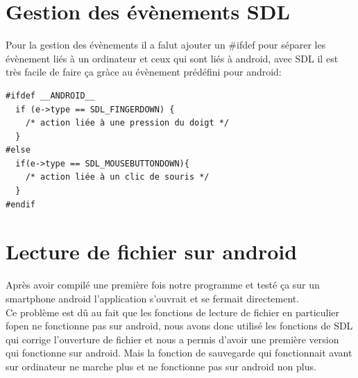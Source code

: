 \documentclass[12pt]{report}
\begin{document}
\section{Gestion des évènements SDL}
\textnormal{Pour la gestion des évènements il a falut ajouter un \#ifdef pour séparer les évènement liés à un ordinateur et ceux qui sont liés à android, avec SDL il est très facile de faire ça gràce au évènement prédéfini pour android:}
\begin{verbatim}
#ifdef __ANDROID__
  if (e->type == SDL_FINGERDOWN) {
    /* action liée à une pression du doigt */
  }
#else
  if(e->type == SDL_MOUSEBUTTONDOWN){
    /* action liée à un clic de souris */
  }
#endif
\end{verbatim}
\section{Lecture de fichier sur android}
\textnormal{Après avoir compilé une première fois notre programme et testé ça sur un smartphone android l'application s'ouvrait et se fermait directement.\\Ce problème est dû au fait que les fonctions de lecture de fichier en particulier fopen ne fonctionne pas sur android, nous avons donc utilisé les fonctions de SDL qui corrige l'ouverture de fichier et nous a permis d'avoir une première version qui fonctionne sur android. Mais la fonction de sauvegarde qui fonctionnait avant sur ordinateur ne marche plus et ne fonctionne pas sur android non plus.}
\end{document}
